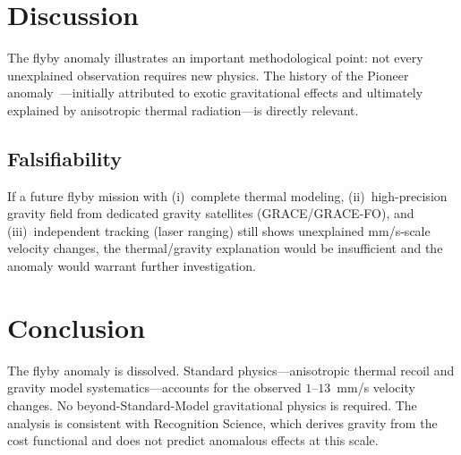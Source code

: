 \documentclass[12pt,a4paper]{article}
\theoremstyle{definition}
\theoremstyle{remark}
\begin{document}
\section{Discussion}
\label{sec:discuss}

The flyby anomaly illustrates an important methodological point: not
every unexplained observation requires new physics.  The history of the
Pioneer anomaly~\cite{Turyshev2012}---initially attributed to exotic
gravitational effects and ultimately explained by anisotropic thermal
radiation---is directly relevant.

\subsection{Falsifiability}

If a future flyby mission with (i)~complete thermal modeling,
(ii)~high-precision gravity field from dedicated gravity satellites
(GRACE/GRACE-FO), and (iii)~independent tracking (laser ranging) still
shows unexplained mm/s-scale velocity changes, the thermal/gravity
explanation would be insufficient and the anomaly would warrant
further investigation.

\section{Conclusion}
\label{sec:conclusion}

The flyby anomaly is dissolved.  Standard physics---anisotropic thermal
recoil and gravity model systematics---accounts for the observed
$1$--$13$~mm/s velocity changes.  No beyond-Standard-Model gravitational
physics is required.  The analysis is consistent with Recognition Science,
which derives gravity from the cost functional and does not predict
anomalous effects at this scale.
\end{document}
